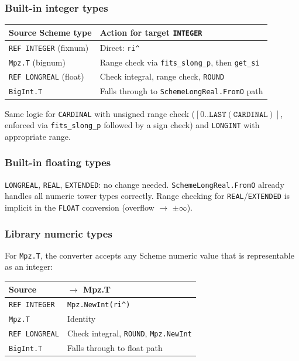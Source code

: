\documentclass[11pt]{article}
\begin{document}
\subsubsection{Built-in integer types}

\begin{center}
\begin{tabular}{ll}
\toprule
\textbf{Source Scheme type} & \textbf{Action for target \texttt{INTEGER}} \\
\midrule
\texttt{REF INTEGER} (fixnum) & Direct: \texttt{ri\^{}} \\
\texttt{Mpz.T} (bignum) & Range check via \texttt{fits\_slong\_p}, then \texttt{get\_si} \\
\texttt{REF LONGREAL} (float) & Check integral, range check, \texttt{ROUND} \\
\texttt{BigInt.T} & Falls through to \texttt{SchemeLongReal.FromO} path \\
\bottomrule
\end{tabular}
\end{center}

Same logic for \texttt{CARDINAL} with unsigned range check
($[0..\mathtt{LAST(CARDINAL)}]$, enforced via \texttt{fits\_slong\_p}
followed by a sign check) and \texttt{LONGINT} with appropriate range.

\subsubsection{Built-in floating types}

\texttt{LONGREAL}, \texttt{REAL}, \texttt{EXTENDED}: no change needed.
\texttt{SchemeLongReal.FromO} already handles all numeric tower types
correctly.  Range checking for \texttt{REAL}/\texttt{EXTENDED} is
implicit in the \texttt{FLOAT} conversion (overflow $\to$ $\pm\infty$).

\subsubsection{Library numeric types}

For \texttt{Mpz.T}, the converter accepts any Scheme numeric value
that is representable as an integer:

\begin{center}
\begin{tabular}{ll}
\toprule
\textbf{Source} & \textbf{$\to$ Mpz.T} \\
\midrule
\texttt{REF INTEGER}   & \texttt{Mpz.NewInt(ri\^{})} \\
\texttt{Mpz.T}         & Identity \\
\texttt{REF LONGREAL}  & Check integral, \texttt{ROUND}, \texttt{Mpz.NewInt} \\
\texttt{BigInt.T}       & Falls through to float path \\
\bottomrule
\end{tabular}
\end{center}
\end{document}
